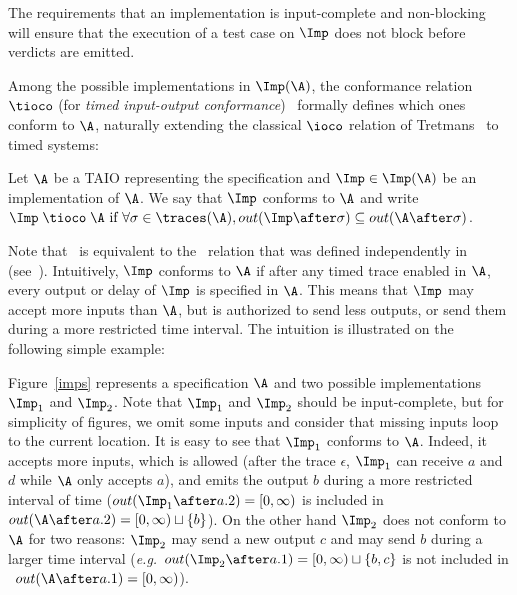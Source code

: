 \documentclass{LMCS}
\theoremstyle{plain}\newtheorem{proposition}[thm]{Proposition}
\def\eg{{\em e.g.}}
\begin{document}
The requirements that an implementation is input-complete and non-blocking
will ensure that the execution of a test case on $\Imp$ does not
block before verdicts are emitted.  


Among the possible implementations in $\Imp(\A)$, 
the conformance relation $\tioco$ (for {\em timed input-output conformance})~\cite{KrichenTripakis09} 
formally defines which ones conform to $\A$,
naturally extending the classical $\ioco$ relation of Tretmans~\cite{Tretmans-SCT96} to timed
systems:
\begin{defi}
Let $\A$ be a TAIO representing the specification and $\Imp \in \Imp(\A)$ be an implementation of $\A$. We say that $\Imp$ conforms to $\A$ and write
$\Imp \; \tioco \; \A \mbox{ if } \forall \sigma \in \traces(\A), out(\Imp \after \sigma) \subseteq out(\A \after \sigma)$.
\end{defi}

Note that \tioco\, is equivalent to the \rtioco\, relation  that was defined
independently in~\cite{Larsen-Mikucionis-Nielsen-2004} (see~\cite{DBLP:conf/formats/SchmaltzT08}).
Intuitively, $\Imp$ conforms to $\A$ if after any timed trace enabled
in $\A$, every output or delay of $\Imp$ is specified in $\A$. 
This means that $\Imp$ may accept more inputs than $\A$,
but is authorized to send less outputs, 
or send them during a more restricted time interval. 
The intuition is illustrated on the following simple example:

\begin{exa}
Figure~\ref{imps} represents a specification $\A$ and two possible 
implementations $\Imp_1$ and $\Imp_2$.
Note that $\Imp_1$ and $\Imp_2$ should be input-complete, but for simplicity of figures, 
we omit some inputs and consider that missing inputs loop 
to the current location. It is easy to see that $\Imp_1$ conforms to $\A$.
Indeed, it accepts more inputs, which is allowed
(after the trace $\epsilon$, $\Imp_1$ can receive $a$ and $d$
while $\A$ only accepts $a$), 
and emits the output $b$ during a more restricted interval 
of time ($out(\Imp_1 \after a.2)=[0,\infty)$ is included in $out(\A \after a.2)=[0,\infty) \sqcup \{b\}$).
On the other hand $\Imp_2$ does not conform to $\A$ for 
two reasons:
$\Imp_2$  may send a new output $c$ 
and may send $b$ during a larger time interval 
(\eg~$out(\Imp_2 \after a.1)=[0,\infty) \sqcup \{b,c\}$
is not included in ~$out(\A \after a.1)=[0,\infty)$). 
\end{exa}
\end{document}
